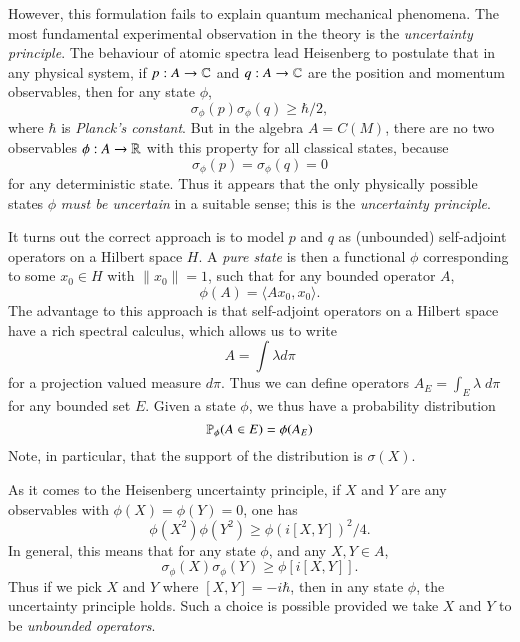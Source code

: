 

However, this formulation fails to explain quantum mechanical phenomena. The most fundamental experimental observation in the theory is the \emph{uncertainty principle}. The behaviour of atomic spectra lead Heisenberg to postulate that in any physical system, if $p: A \to \operatorname{\mathbb{C}}$ and $q: A \to \operatorname{\mathbb{C}}$ are the position and momentum observables, then for any state $\phi$,
%
\[ \sigma_\phi(p) \sigma_\phi(q) \geq \hbar / 2, \]
%
where $\hbar$ is \emph{Planck's constant}. But in the algebra $A = C(M)$, there are no two observables $\phi: A \to \operatorname{\mathbb{R}}$ with this property for all classical states, because
%
\[ \sigma_\phi(p) = \sigma_\phi(q) = 0 \]
%
for any deterministic state. Thus it appears that the only physically possible states $\phi$ \emph{must be uncertain} in a suitable sense; this is the \emph{uncertainty principle}. 

It turns out the correct approach is to model $p$ and $q$ as (unbounded) self-adjoint operators on a Hilbert space $H$. A \emph{pure state} is then a functional $\phi$ corresponding to some $x_0 \in H$ with $\| x_0 \| = 1$, such that for any bounded operator $A$,
%
\[ \phi(A) = \langle Ax_0, x_0 \rangle. \]
%
The advantage to this approach is that self-adjoint operators on a Hilbert space have a rich spectral calculus, which allows us to write
%
\[ A = \int \lambda d\pi \]
%
for a projection valued measure $d\pi$. Thus we can define operators $A_E = \int_E \lambda\; d\pi$ for any bounded set $E$. Given a state $\phi$, we thus have a probability distribution
%
\[ \operatorname{\mathbb{P}}_\phi(A \in E) = \phi(A_E) \]
%
Note, in particular, that the support of the distribution is $\sigma(X)$.

As it comes to the Heisenberg uncertainty principle, if $X$ and $Y$ are any observables with $\phi(X) = \phi(Y) = 0$, one has
%
\[ \phi(X^2) \phi(Y^2) \geq \phi(i[X,Y])^2 / 4. \]
%
In general, this means that for any state $\phi$, and any $X,Y \in A$,
%
\[ \sigma_\phi(X) \sigma_\phi(Y) \geq \phi[i[X,Y]]. \]
%
Thus if we pick $X$ and $Y$ where $[X,Y] = - i \hbar$, then in any state $\phi$, the uncertainty principle holds. Such a choice is possible provided we take $X$ and $Y$ to be \emph{unbounded operators}.

